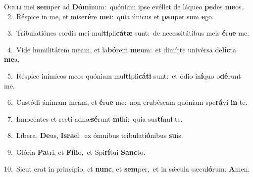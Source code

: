 \lettrine{\initial\textcolor{\initialcolor}{O}}{culi} mei \textbf{sem}\-per ad \textbf{Dó}\-\textbf{mi}num:~\star quóniam ipse evéllet de láqueo \textbf{pe}\-des \textbf{me}\-os.\\
{\numbfont\textcolor{\numbcolor}{~2.}}~Réspice in me, et mise\-\textbf{ré}\-re \textbf{me}\-i:~\star quia únicus et \textbf{pau}\-per sum \textbf{e}\-go.\par
{\numbfont\textcolor{\numbcolor}{~3.}}~Tribulatiónes cordis mei mul\-\textbf{ti}\-pli\-\textbf{cá}\-\textbf{tæ} sunt:~\star de necessitátibus meis \textbf{é}\-ru\textbf{e} me.\par
{\numbfont\textcolor{\numbcolor}{~4.}}~Vide humilitátem meam, et la\-\textbf{bó}\-rem \textbf{me}\-um:~\star et dimítte univérsa de\-\textbf{líc}\-ta \textbf{me}\-a.\par
{\numbfont\textcolor{\numbcolor}{~5.}}~Réspice inimícos meos quóniam mul\-\textbf{ti}\-pli\-\textbf{cá}\-\textbf{ti} sunt:~\star et ódio in\-\textbf{í}\-quo o\-\textbf{dé}\-runt me.\par
{\numbfont\textcolor{\numbcolor}{~6.}}~Custódi ánimam meam, et \textbf{é}\-ru\textbf{e} me:~\star non erubéscam quóniam spe\-\textbf{rá}\-vi \textbf{in} te.\par
{\numbfont\textcolor{\numbcolor}{~7.}}~Innocéntes et recti adhæ\-\textbf{sé}\-runt \textbf{mi}\-hi:~\star quia sus\-\textbf{tí}\-nu\textbf{i} te.\par
{\numbfont\textcolor{\numbcolor}{~8.}}~Líbera, \textbf{De}\-us, \textbf{Is}\-\textbf{ra}ël:~\star ex ómnibus tribulati\-\textbf{ó}\-nibus \textbf{su}\-is.\par
{\numbfont\textcolor{\numbcolor}{~9.}}~Glória \textbf{Pa}\-tri, et \textbf{Fí}\-\textbf{li}o,~\star et Spi\-\textbf{rí}\-tui \textbf{Sanc}\-to.\par
{\numbfont\textcolor{\numbcolor}{10.}}~Sicut erat in princípio, et \textbf{nunc}\-, et \textbf{sem}\-per,~\star et in sǽcula sæcu\-\textbf{ló}\-rum. \textbf{A}\-men.\par
